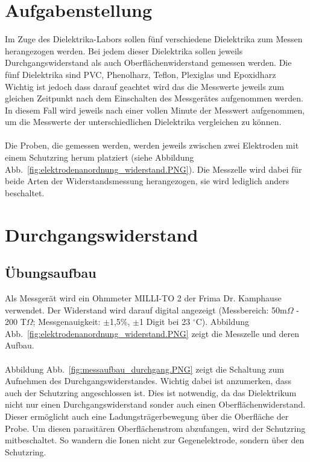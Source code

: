 \documentclass[a4paper,twoside,12pt,DIV=13,BCOR=5mm,numbers=noenddot,cleardoublepage=empty]{scrbook}
\begin{document}
        \section{Aufgabenstellung}
        Im Zuge des Dielektrika-Labors sollen f\"unf verschiedene Dielektrika 
        zum Messen herangezogen werden. Bei jedem dieser Dielektrika sollen 
        jeweils Durchgangswiderstand als auch Oberfl\"achenwiderstand gemessen 
        werden. Die f\"unf Dielektrika sind PVC, Phenolharz, Teflon, Plexiglas und 
        Epoxidharz\\
        Wichtig ist jedoch dass darauf geachtet wird das die Messwerte jeweils zum 
        gleichen Zeitpunkt nach dem Einschalten des Messger\"ates aufgenommen werden.
        In diesem Fall wird jeweils nach einer vollen Minute der Messwert 
        aufgenommen, um die Messwerte der unterschiedlichen Dielektrika vergleichen
        zu k\"onnen.
        \\
        \\
        Die Proben, die gemessen werden, werden jeweils zwischen zwei Elektroden
        mit einem Schutzring herum platziert (siehe Abbildung Abb.~\ref{fig:elektrodenanordnung_widerstand.PNG}).
        Die Messzelle wird dabei f\"ur beide Arten der Widerstandsmessung herangezogen,
        sie wird lediglich anders beschaltet.

        \section{Durchgangswiderstand}
            \subsection{\"Ubungsaufbau}
            Als Messgerät wird ein Ohmmeter MILLI-TO 2 der Frima Dr. Kamphause 
            verwendet. Der Widerstand wird darauf digital angezeigt 
            (Messbereich: 50m$\Omega$ - 200 T$\Omega$; Messgenauigkeit: $\pm$1,5\%,
            $\pm$1 Digit bei 23 $^{\circ}$C). Abbildung 
            Abb.~\ref{fig:elektrodenanordnung_widerstand.PNG} zeigt die Messzelle und deren Aufbau.
            \\
            \\
            Abbildung Abb.~\ref{fig:messaufbau_durchgang.PNG} zeigt die Schaltung zum 
            Aufnehmen des Durchgangswiderstandes. Wichtig dabei ist anzumerken, dass auch 
            der Schutzring angeschlossen ist. Dies ist notwendig, da das Dielektrikum nicht nur 
            einen Durchgangswiderstand sonder auch einen Oberfl\"achenwiderstand. Dieser 
            erm\"oglicht auch eine Ladungstr\"agerbewegung \"uber die Oberfl\"ache der Probe.
            Um diesen parasit\"aren Oberfl\"achenstrom abzufangen, wird der Schutzring 
            mitbeschaltet. So wandern die Ionen nicht zur Gegenelektrode, sondern \"uber den Schutzring.
\end{document}
